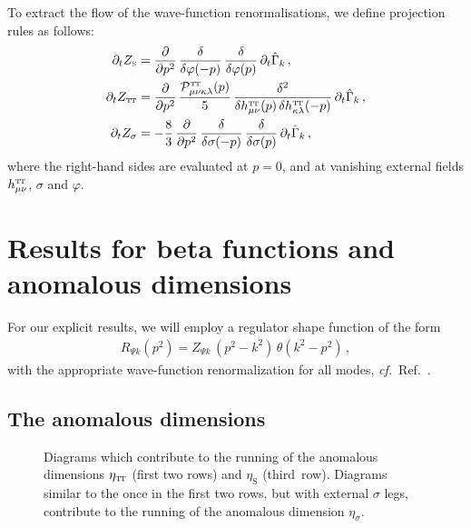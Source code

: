 \documentclass[11pt]{book}
\newcommand\TTspace{ -1pt }
\newcommand\TT{ \scriptscriptstyle{\mathrm{T\hspace{\TTspace}T}} }
\newcommand\hTTmunu{ h^{\scriptscriptstyle{\mathrm{T\hspace{\TTspace}T}}}_{\mu\nu} }
\newcommand\etaTT{ \eta_{\scriptscriptstyle{\mathrm{T\hspace{\TTspace}T}}} }
\newcommand\ZTT{ Z_{\scriptscriptstyle{\mathrm{T\hspace{\TTspace}T}}} }
\newcommand\etaS{ \eta_{\scriptscriptstyle{\mathrm{S}}} }
\newcommand\ZS{ Z_{\scriptscriptstyle{\mathrm{S}}} }
\newcommand\cf{\textit{cf.}\ }
\numberwithin{equation}{chapter}
\begin{document}
To extract the flow of the wave-function renormalisations, we define projection rules as follows:
\begin{align}
  \partial_t \ZS &=
  \frac{\partial}{\partial p^2} \, \frac{\delta}{\delta \varphi(-p)} \, \frac{\delta}{\delta \varphi(p)} \, \partial_t \hat \Gamma_k \,, \\
  \partial_t \ZTT &=
  \frac{\partial}{\partial p^2}  \, \frac{\mathcal P^{\TT}_{\mu \nu\kappa\lambda}(p)}{5}  \, \frac{\delta^2}{\delta \hTTmunu (p) \, \delta h^{\TT}_{\kappa \lambda}(-p)} \, \partial_t \hat \Gamma_k \,, \\
  \partial_t Z_{\sigma} &= -\frac{8}{3} \,
  \frac{\partial}{\partial p^2} \, \frac{\delta}{\delta \sigma(-p)} \, \frac{\delta}{\delta \sigma(p)} \, \partial_t \hat \Gamma_k \,,
\end{align}
where the right-hand sides are evaluated at $p=0$,
and at vanishing external fields $\hTTmunu$, $\sigma$ and $\varphi$.


\section{Results for beta functions and anomalous dimensions}

For our explicit results, we will employ a regulator shape function of the form
\begin{align}
  \nonumber
  R_{\Psi k} \left( p^2\right) = Z_{\Psi k} \, (p^2-k^2) \, \theta(k^2-p^2) \,,
\end{align}
with the appropriate wave-function renormalization for all modes, \cf Ref.~\cite{Litim:2001up}.


\subsection{The anomalous dimensions}

\begin{figure}[p]
  \begin{center}
    
  \end{center}
  \caption{
    Diagrams which contribute to the running of the anomalous dimensions
    $\etaTT$ (first two rows) and $\etaS$ (third~row).
    Diagrams similar to the once in the first two rows, but with external $\sigma$ legs,
    contribute to the running of the anomalous dimension $\eta_{\sigma}$.
  }
  \label{fig:eta-diagrams-ch4}
\end{figure}
\end{document}
